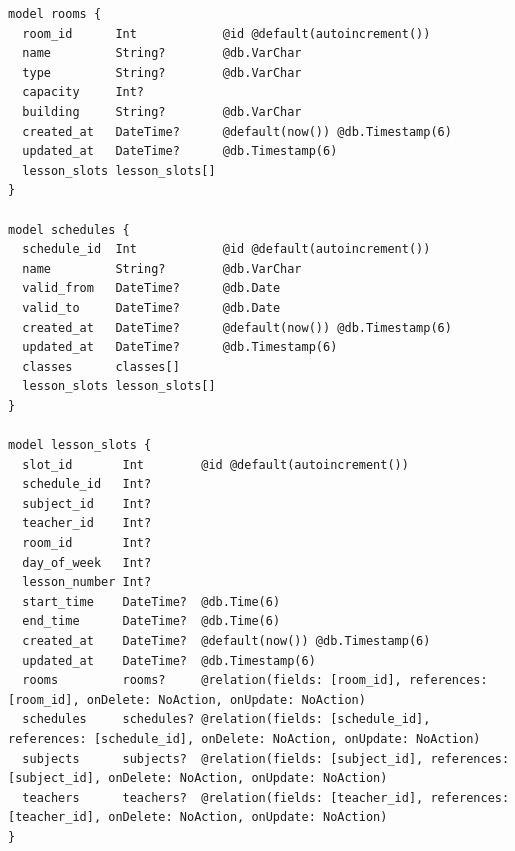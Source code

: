 \begin{listing}[H]
\begin{verbatim}
model rooms {
  room_id      Int            @id @default(autoincrement())
  name         String?        @db.VarChar
  type         String?        @db.VarChar
  capacity     Int?
  building     String?        @db.VarChar
  created_at   DateTime?      @default(now()) @db.Timestamp(6)
  updated_at   DateTime?      @db.Timestamp(6)
  lesson_slots lesson_slots[]
}

model schedules {
  schedule_id  Int            @id @default(autoincrement())
  name         String?        @db.VarChar
  valid_from   DateTime?      @db.Date
  valid_to     DateTime?      @db.Date
  created_at   DateTime?      @default(now()) @db.Timestamp(6)
  updated_at   DateTime?      @db.Timestamp(6)
  classes      classes[]
  lesson_slots lesson_slots[]
}

model lesson_slots {
  slot_id       Int        @id @default(autoincrement())
  schedule_id   Int?
  subject_id    Int?
  teacher_id    Int?
  room_id       Int?
  day_of_week   Int?
  lesson_number Int?
  start_time    DateTime?  @db.Time(6)
  end_time      DateTime?  @db.Time(6)
  created_at    DateTime?  @default(now()) @db.Timestamp(6)
  updated_at    DateTime?  @db.Timestamp(6)
  rooms         rooms?     @relation(fields: [room_id], references: [room_id], onDelete: NoAction, onUpdate: NoAction)
  schedules     schedules? @relation(fields: [schedule_id], references: [schedule_id], onDelete: NoAction, onUpdate: NoAction)
  subjects      subjects?  @relation(fields: [subject_id], references: [subject_id], onDelete: NoAction, onUpdate: NoAction)
  teachers      teachers?  @relation(fields: [teacher_id], references: [teacher_id], onDelete: NoAction, onUpdate: NoAction)
}
\end{verbatim}
\caption{Prisma -- Organisationsmodelle (Departments, Klassen, Fächer, Räume, Stundenpläne)}
\label{lst:prisma_organisation}
\end{listing}

